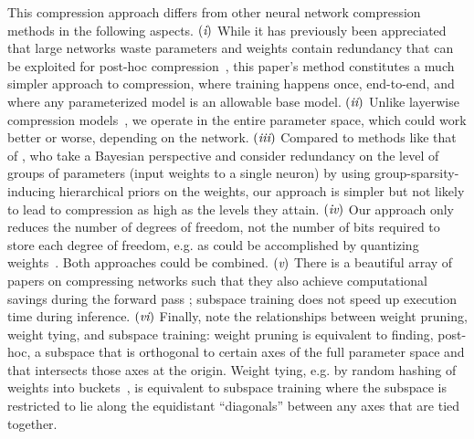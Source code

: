 \documentclass{article} %
\begin{document}
This compression approach differs from other neural network compression methods in the following aspects.
$(\RN{1})$
While it has previously been appreciated that large networks waste parameters \citep{dauphin-2013-arXiv-big-neural-networks-waste} and weights contain redundancy \citep{denil-2013-NIPS-predicting-parameters-in-deep} that can be exploited for post-hoc compression~\citep{wen2016learning}, this paper's method constitutes a much simpler approach to compression, where training happens once, end-to-end, and where any parameterized model is an allowable base model.
$(\RN{2})$
Unlike layerwise compression models~\citep{denil-2013-NIPS-predicting-parameters-in-deep,wen2016learning}, we operate in the entire parameter space, which could work better or worse, depending on the network.
$(\RN{3})$
Compared to methods like that of \cite{louizos-2017-arXiv-bayesian-compression-for-deep}, who take a Bayesian perspective and consider redundancy on the level of groups of parameters (input weights to a single neuron) by using group-sparsity-inducing hierarchical priors on the weights, our approach is simpler but not likely to lead to compression as high as the levels they attain.
$(\RN{4})$
Our approach only reduces the number of degrees of freedom, not the number of bits required to store each degree of freedom, e.g. as could be accomplished by quantizing weights~\citep{han2015deep}. Both approaches could be combined.
$(\RN{5})$
There is a beautiful array of papers on compressing networks such that they also achieve computational savings during the forward pass \citep{wen2016learning,han2015deep,yang-2015-CVPR-deep-fried-convnets}; subspace training does not speed up execution time during inference.
$(\RN{6})$
Finally, note the relationships between weight pruning, weight tying, and subspace training: weight pruning is equivalent to finding, post-hoc, a subspace that is orthogonal to certain axes of the full parameter space and that intersects those axes at the origin. Weight tying, e.g. by random hashing of weights into buckets~\citep{chen-2015-arXiv-compressing-neural-networks}, is equivalent to subspace training where the subspace is restricted to lie along the equidistant ``diagonals'' between any axes that are tied together.
\end{document}
